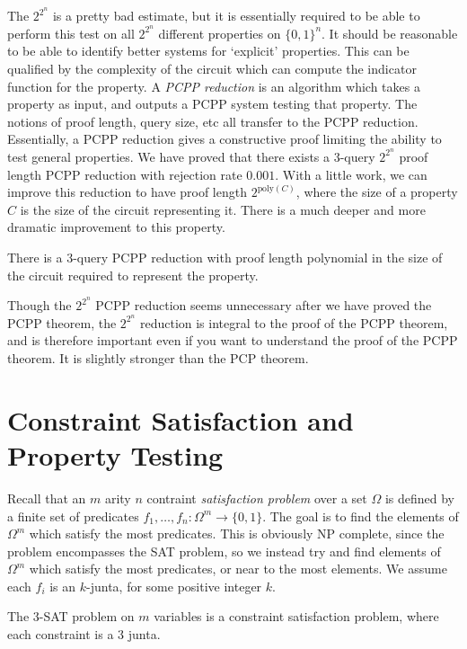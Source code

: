 The $2^{2^n}$ is a pretty bad estimate, but it is essentially required to be able to perform this test on all $2^{2^n}$ different properties on $\{ 0, 1 \}^n$. It should be reasonable to be able to identify better systems for `explicit' properties. This can be qualified by the complexity of the circuit which can compute the indicator function for the property. A \emph{PCPP reduction} is an algorithm which takes a property as input, and outputs a PCPP system testing that property. The notions of proof length, query size, etc all transfer to the PCPP reduction. Essentially, a PCPP reduction gives a constructive proof limiting the ability to test general properties. We have proved that there exists a 3-query $2^{2^n}$ proof length PCPP reduction with rejection rate $0.001$. With a little work, we can improve this reduction to have proof length $2^{\text{poly}(C)}$, where the size of a property $C$ is the size of the circuit representing it. There is a much deeper and more dramatic improvement to this property.

\begin{theorem}[PCPP]
    There is a 3-query PCPP reduction with proof length polynomial in the size of the circuit required to represent the property.
\end{theorem}

Though the $2^{2^n}$ PCPP reduction seems unnecessary after we have proved the PCPP theorem, the $2^{2^n}$ reduction is integral to the proof of the PCPP theorem, and is therefore important even if you want to understand the proof of the PCPP theorem. It is slightly stronger than the PCP theorem.

\section{Constraint Satisfaction and Property Testing}

Recall that an $m$ arity $n$ contraint \emph{satisfaction problem} over a set $\Omega$ is defined by a finite set of predicates $f_1, \dots, f_n: \Omega^m \to \{ 0, 1 \}$. The goal is to find the elements of $\Omega^m$ which satisfy the most predicates. This is obviously NP complete, since the problem encompasses the SAT problem, so we instead try and find elements of $\Omega^m$ which satisfy the most predicates, or near to the most elements. We assume each $f_i$ is an $k$-junta, for some positive integer $k$.

\begin{example}
    The 3-SAT problem on $m$ variables is a constraint satisfaction problem, where each constraint is a 3 junta.
\end{example}

